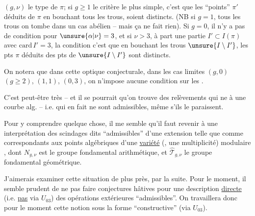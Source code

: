  $(g,\nu)$ le type de $\pi$;  si $g\geq1$ le critère le plus simple, c'est que les ``\inserted{$\Gamma^{\natural}$-}points''  $\pi'$ déduits de $\pi$ en bouchant tous les trous, soient distincts.  (NB si $g=1$,    tous les trous on tombe dans un cas abélien -- mais ça ne fait rien). Si $g=0$,  il n'y a pas de condition pour $\unsure{\alpha|\nu}=3$, et si $\nu>3$,  à part une  partie $I'\subset I(\pi)$ avec $\mathrm{card}\,I'=3$, la condition c'est que en bouchant les trous  $\unsure{I\setminus I'}$, les \inserted{$\Gamma^{\natural}$-}pts  $\pi$ déduits des pts de $\unsure{I\setminus I'}$ sont distincts.

On notera que dans cette optique conjecturale, dans les cas limites $(g,0)$ $(g\geq2)$, $(1,1)$, $(0,3)$, on n'impose aucune condition  sur les .


C'est peut-être très  -- et il se pourrait qu'on trouve des relèvements qui ne   à une courbe alg. -- i.e. qui en fait ne sont  admissibles, même s'ils le paraissent.

Pour y comprendre quelque chose, il me semble qu'il faut revenir à une interprétation des  scindages dits ``admissibles'' d'une extension telle que
comme correspondants aux points algébriques d'une \uline{variété} (, une multiplicité) modulaire , dont $N_{g,\nu}$ est le groupe fondamental arithmétique, et $\widehat{\mathcal T}_{g,\nu}$ le groupe fondamental géométrique.

J'aimerais examiner cette situation de plus près, par la suite. Pour le moment, il semble prudent de ne pas faire  conjectures hâtives pour  une description \uline{directe} (i.e. \uline{pas} via $U_{03}$) des opérations extérieures ``admissibles''. On travaillera donc pour le moment  cette notion sous la forme ``constructive'' (via $U_{03}$).

